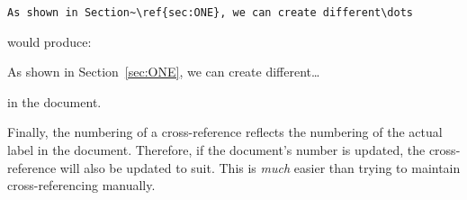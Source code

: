 \begin{center}
\begin{verbatim}
As shown in Section~\ref{sec:ONE}, we can create different\dots
\end{verbatim}
\end{center}

\noindent would produce:

\begin{center}
As shown in Section~\ref{sec:ONE}, we can create different\dots
\end{center}

\noindent in the document.

Finally, the numbering of a cross-reference reflects the numbering
of the actual label in the document.  Therefore, if the document's
number is updated, the cross-reference will also be updated to
suit.  This is \emph{much} easier than trying to maintain
cross-referencing manually.
